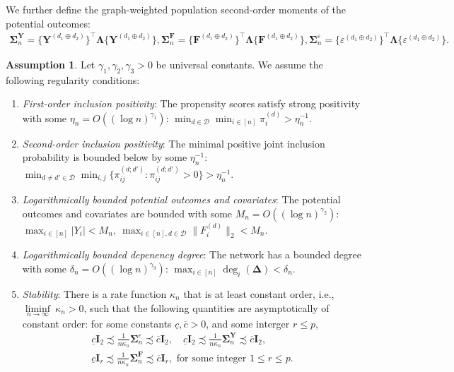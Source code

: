 \documentclass[twoside,letterpaper]{article}
\theoremstyle{plain}
\theoremstyle{definition}
\newtheorem{assumption}[theorem]{Assumption}
\theoremstyle{remark}
\newcommand{\bY}{\boldsymbol{Y}}
\newcommand{\bF}{\boldsymbol{F}}
\newcommand{\bI}{\boldsymbol{I}}
\newcommand{\bLambda}{\boldsymbol{\Lambda}}
\newcommand{\bSigma}{\boldsymbol{\Sigma}}
\newcommand{\bDelta}{\boldsymbol{\Delta}}
\newcommand{\cD}{\mathcal{D}}
\begin{document}
We further define the graph-weighted population second-order moments
of the potential outcomes:
\begin{gather*}
\bSigma^{\bY}_n = \{\bY^{(d_1 \oplus d_2)}\}^{\top} \bLambda \{\bY^{(d_1 \oplus d_2)}\}, 
\bSigma^{\bF}_n = \{\bF^{(d_1 \oplus d_2)}\}^{\top} \bLambda \{\bF^{(d_1 \oplus d_2)}\}, 
\bSigma^{\varepsilon}_n = \{\varepsilon^{(d_1 \oplus d_2)}\}^{\top} \bLambda \{\varepsilon^{(d_1 \oplus d_2)}\}.
\end{gather*}
\begin{assumption}
    Let $\gamma_1, \gamma_2, \gamma_3 > 0$ be universal constants. We assume the following regularity conditions: 
    \begin{enumerate}[label=(\alph*), ref=\theassumption (\alph*)]
        \item \label{asp::positivity_a} \textit{  First-order inclusion positivity}: The propensity scores satisfy strong positivity with some  $\eta_n = O((\log n)^{\gamma_1})$: $
        \min_{d\in\cD} \min_{i\in[n]} \pi_i^{(d)} > \eta_n^{-1}$.

        \item \label{asp::positivity_b} \textit{Second-order inclusion positivity}: The minimal positive joint inclusion probability is bounded below by some $\eta_n^{-1}$: $\min_{d\neq d'\in\cD} \min_{i,j} \{\pi_{ij}^{(d;d')}: \pi_{ij}^{(d;d')} > 0\} > \eta_n^{-1}$. 

        \item \label{asp::bound} \textit{Logarithmically bounded potential outcomes and covariates}: The potential outcomes and covariates are bounded with some $M_n = O((\log n)^{\gamma_2})$: $\max_{i\in[n]} |Y_i| < M_n, ~ \max_{i\in[n], d\in\cD} \|F_i^{(d)}\|_2 < M_n$.

        \item \label{asp::bounded_degree} \textit{Logarithmically bounded depenency degree}: The network has a bounded degree with some $\delta_n = O((\log n)^{\gamma_3})$: $\max_{i\in[n]} \deg_i(\bDelta) < \delta_n$.

        \item \label{asp::stability} \textit{Stability}: 
        There is a rate function $\kappa_n$ that is at least constant order, i.e., $ \underset{n\to\infty}{\liminf} ~\kappa_n > 0$, such that the following quantities are asymptotically of constant order: for some constants $\underline{c}, \overline{c} > 0$, and some interger $r \le p$,
        \begin{gather}
            \underline{c}\bI_2\precsim\frac{1}{n\kappa_n}\bSigma^{\varepsilon}_n \precsim \overline{c}\bI_2, \quad \underline{c}\bI_2\precsim\frac{1}{n\kappa_n}\bSigma^{\bY}_n \precsim \overline{c}\bI_2, \\ \underline{c}\bI_r\precsim\frac{1}{n\kappa_n}\bSigma^{\bF}_n \precsim \overline{c}\bI_r, \text{ for some integer } 1 \le r \le p .
        \end{gather}
    \end{enumerate}
\end{assumption}
\end{document}

